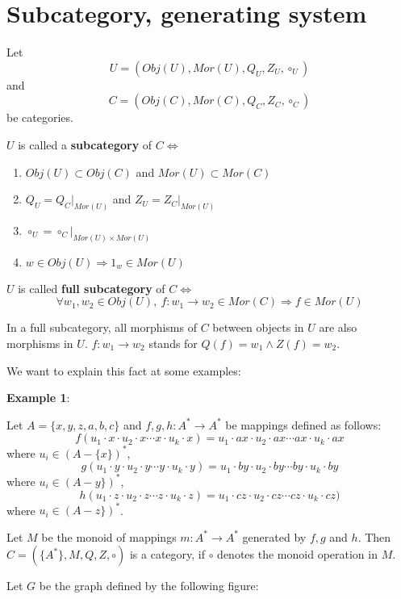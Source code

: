 \section{Subcategory, generating system}

\begin{definition}
Let \[ U = (Obj(U), Mor(U), Q_U, Z_U, \circ_U) \] and \[C = (Obj(C), Mor(C),
Q_C, Z_C, \circ_C)\] be categories.

$U$ is called a {\bf subcategory} of $C \Leftrightarrow$
\begin{enumerate}
  \item $Obj(U) \subset Obj(C)$ and $Mor(U) \subset Mor(C)$
  \item $Q_U = Q_C|_{Mor(U)}$ and $Z_U = Z_C|_{Mor(U)}$
  \item $\circ_U = \circ_C|_{Mor(U) \times Mor(U)}$
  \item $w \in Obj(U) \Rightarrow 1_w \in Mor(U)$
\end{enumerate}
\end{definition}

$U$ is called {\bf full subcategory} of $C \Leftrightarrow$
\[ \forall w_1, w_2 \in Obj(U),\ f: w_1 \to w_2 \in Mor(C) \Rightarrow f \in
Mor(U) \]

In a full subcategory, all morphisms of $C$ between objects in $U$ are also
morphisms in $U$. $f: w_1 \to w_2$ stands for $Q(f) = w_1 \wedge Z(f) = w_2$.

We want to explain this fact at some examples:

{\bf Example 1}:

Let $A = \{ x,y,z,a,b,c \}$ and $f, g, h: A^* \to A^*$ be mappings defined as
follows:
\[ f(u_1 \cdot x \cdot u_2 \cdot x \cdots x \cdot u_k \cdot x) = 
u_1 \cdot ax \cdot u_2 \cdot ax \cdots ax \cdot u_k \cdot ax \]
where $u_i \in (A - \{x\})^*$,
\[ g(u_1 \cdot y \cdot u_2 \cdot y \cdots y \cdot u_k \cdot y) = 
u_1 \cdot by \cdot u_2 \cdot by \cdots by \cdot u_k \cdot by \]
where $u_i \in (A - y\})^*$,
\[ h(u_1 \cdot z \cdot u_2 \cdot z \cdots z \cdot u_k \cdot z) = 
u_1 \cdot cz \cdot u_2 \cdot cz \cdots cz \cdot u_k \cdot cz) \]
where $u_i \in (A - z\})^*$.

Let $M$ be the monoid of mappings $m: A^* \to A^*$ generated by $f, g$ and $h$.
Then $C = (\{A^*\}, M, Q, Z, \circ)$ is a category, if $\circ$ denotes the
monoid operation in $M$.

Let $G$ be the graph defined by the following figure:


